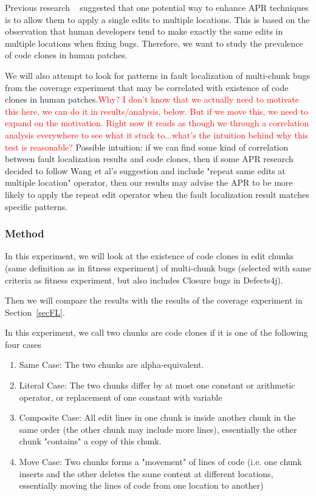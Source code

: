\documentclass[sigconf, timestamp-false, anonymous=true]{acmart}
\newcommand\todo[1]{\textcolor{red}{#1}}
\begin{document}
Previous research ~\cite{wang2018} suggested that one potential way to enhance
APR techniques is to allow them to apply a single edits to multiple locations.
This is based on the observation that human developers tend to make exactly the 
same edits in multiple locations when fixing bugs. Therefore, we want to study the
prevalence of code clones in human patches.

We will also attempt to look for patterns in fault localization of multi-chunk bugs
from the coverage experiment that may be correlated with existence of code clones in 
human patches.\todo{Why? I don't know that we actually need to motivate this
  here, we can do it in results/analysis, below.  But if we move this, we need
  to expand on the motivation.  Right now it reads as though we through a
  correlation analysis everywhere to see what it stuck to...what's the intuition
  behind why this test is reasonable?}
Possible intuition: if we can find some kind of correlation between fault localization results
and code clones, then if some APR research decided to follow Wang et al's suggestion and
include "repeat same edits at multiple location" operator, then our results may advise
the APR to be more likely to apply the repeat edit operator when the fault localization
result matches specific patterns.

\subsubsection{Method}
In this experiment, we will look at the existence of code clones in 
edit chunks (same definition as in fitness experiment) of multi-chunk bugs (selected
with same criteria as fitness experiment, but also includes Closure bugs in Defects4j).

Then we will compare the results with the results of the coverage experiment in
Section~\ref{secFL}. 

In this experiment, we call two chunks are code clones if it is one of the following four cases
\begin{enumerate}
\item Same Case: The two chunks are alpha-equivalent. 
\item Literal Case: The two chunks differ by at most one constant or arithmetic operator,
 or replacement of one constant with variable 
\item Composite Case: All edit lines in one chunk is inside another chunk in the same order (the other chunk may include
more lines), essentially the other chunk "contains" a copy of this chunk.
\item Move Case: Two chunks forms a "movement" of lines of code (i.e. one chunk inserts and the other deletes the same
  content at different locations, essentially moving the lines of code from one location to another)
\end{enumerate}
\end{document}
